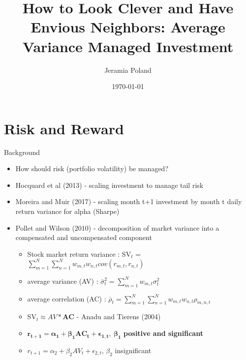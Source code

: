 \documentclass{beamer}
\begin{document}
\title[Average Variance]{How to Look Clever and Have Envious Neighbors: Average
	Variance Managed Investment}   
\author[J. Poland]{Jeramia Poland} 
\date{\today}

\begin{frame}
\titlepage
\end{frame}

\section{Risk and Reward}
\begin{frame}{Background}
	\begin{itemize}[<+->]
		\item How should risk (portfolio volatility) be managed?
		\item Hocquard et al (2013) - scaling investment to manage tail risk
		\item Moreira and Muir (2017) - scaling month t+1 investment by month t daily return variance for alpha (Sharpe)
		\item Pollet and Wilson (2010) - decomposition of market variance into a compensated and uncompensated component
		\begin{itemize}[<+->]
			\item Stock market return variance : SV$_{t}$ = $\sum_{m=1}^{N}\sum_{n=1}^{N}w_{m,t}w_{n,t}cov(r_{m,t},r_{n,t})$
			\item average variance (AV) : $\bar{\sigma}^{2}_{t} = \sum_{m=1}^{N}w_{m,t}\sigma^{2}_{t}$
			\item average correlation (AC) : $\bar{\rho}_{t} = \sum_{m=1}^{N}\sum_{n=1}^{N}w_{m,t}w_{n,t}\rho_{m,n,t}$
			\item SV$_{t} \approx AV*\bm{AC}$  - Anadu and Tierens (2004)
			\item $\bm{r_{t+1} = \alpha_{1} + \beta_{1}AC_{t} + \epsilon_{1,t},~\beta_{1}}$ \textbf{positive and significant}
			\item $r_{t+1} = \alpha_{2} + \beta_{2}AV_{t} + \epsilon_{2,t}$, $\beta_{2}$ insignificant 

\end{itemize}
\end{itemize}
\end{frame}
\end{document}
